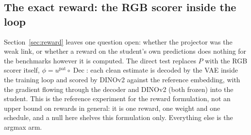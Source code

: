 \documentclass[11pt,a4paper]{article}
\DeclareMathOperator{\Dec}{Dec}
\begin{document}
\subsection{The exact reward: the RGB scorer inside the loop}
\label{sec:rewardx}
Section~\ref{sec:reward} leaves one question open: whether the projector was the weak link, or whether a reward on the student's own predictions does nothing for the benchmarks however it is computed. The direct test replaces $P$ with the RGB scorer itself, $\phi=u^{\mathrm{pat}}\circ\Dec$: each clean estimate is decoded by the VAE inside the training loop and scored by DINOv2 against the reference embedding, with the gradient flowing through the decoder and DINOv2 (both frozen) into the student. This is the reference experiment for the reward formulation, not an upper bound on rewards in general: it is one reward, one weight and one schedule, and a null here shelves this formulation only. Everything else is the argmax arm.
\end{document}
